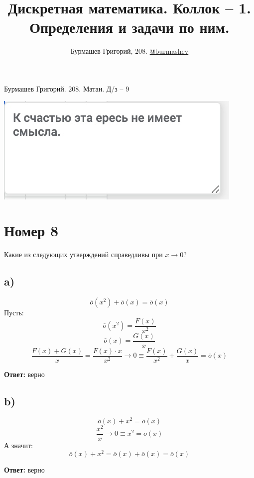 \documentclass[a4paper,12pt]{article}
\author{Бурмашев Григорий, 208. \href{https://teleg.run/burmashev}{@burmashev}}
\title{Дискретная математика. Коллок -- 1. Определения и задачи по ним.}
\date{}
\begin{document}
\begin{center}
Бурмашев Григорий.  208. Матан. Д/з -- 9
\end{center}
\begin{center}
\includegraphics[scale=0.8]{Ye-Yz56_hB4.jpg}
\end{center}
\section*{Номер 8}
Какие из следующих утверждений справедливы при $x \rightarrow 0$?
\subsection*{a)}
\[
\overline{o}(x^2) + \overline{o}(x)= \overline{o}(x)
\]
Пусть:
\[
\overline{o} (x^2) = \frac{F(x)}{x^2}
\]
\[
\overline{o} (x) = \frac{G(x)}{x}
\]
\[
 \frac{F(x) + G(x)}{x} = \frac{F(x) \cdot x}{x^2} \rightarrow 0  \equiv \frac{F(x)}{x^2} + \frac{G(x)}{x}= \overline{o}(x)
\]
\begin{center}
\textbf{Ответ:} верно
\end{center}
\subsection*{b)}
\[
\overline{o}(x) + x^2 = \overline{o}(x)
\]
\[
\frac{x^2}{x} \rightarrow 0 \equiv x^2 = \overline{o}(x)
\]
А значит:
\[
\overline{o}(x) + x^2  = \overline{o}(x) + \overline{o}(x) = \overline{o}(x)
\]
\begin{center}
\textbf{Ответ:} верно
\end{center}
\end{document}
